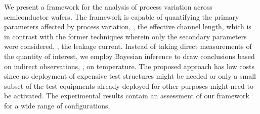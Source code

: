 We present a framework for the analysis of process variation across semiconductor wafers.
The framework is capable of quantifying the primary parameters affected by process variation, \eg, the effective channel length, which is in contrast with the former techniques wherein only the secondary parameters were considered, \eg, the leakage current.
Instead of taking direct measurements of the quantity of interest, we employ Bayesian inference to draw conclusions based on indirect observations, \eg, on temperature.
The proposed approach has low costs since no deployment of expensive test structures might be needed or only a small subset of the test equipments already deployed for other purposes might need to be activated.
The experimental results contain an assessment of our framework for a wide range of configurations.
